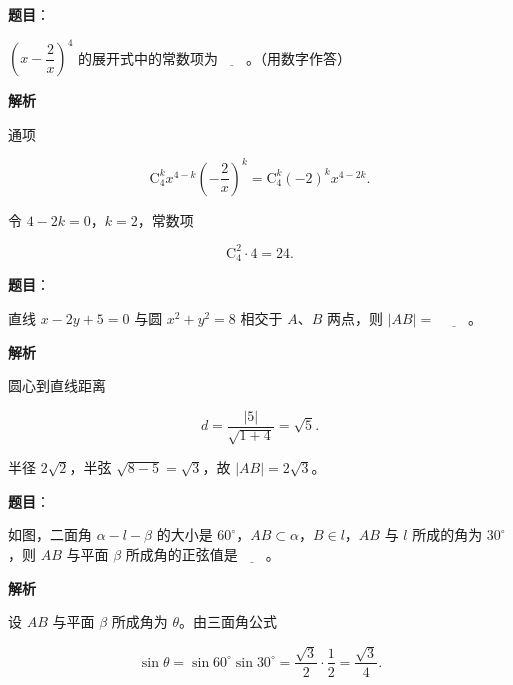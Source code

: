 \begin{answer}

\textbf{题目}：

$\left(x-\dfrac2x\right)^4$ 的展开式中的常数项为$\underline{\qquad}$。（用数字作答）

\textbf{解析}

通项

\nopagebreak[4]
\[\mathrm C_4^k x^{4-k}\left(-\frac2x\right)^k=\mathrm C_4^k(-2)^kx^{4-2k}.\]

令 $4-2k=0$，$k=2$，常数项

\nopagebreak[4]
\[\mathrm C_4^2\cdot4=24.\]


\end{answer}
\begin{answer}

\textbf{题目}：

直线 $x-2y+5=0$ 与圆 $x^2+y^2=8$ 相交于 $A$、$B$ 两点，则 $|AB|=$ $\underline{\qquad}$。

\textbf{解析}

圆心到直线距离

\nopagebreak[4]
\[d=\frac{|5|}{\sqrt{1+4}}=\sqrt5.\]

半径 $2\sqrt2$，半弦 $\sqrt{8-5}=\sqrt3$，故 $|AB|=2\sqrt3$。


\end{answer}
\begin{answer}

\textbf{题目}：

如图，二面角 $\alpha-l-\beta$ 的大小是 $60^\circ$，$AB\subset\alpha$，$B\in l$，$AB$ 与 $l$ 所成的角为 $30^\circ$，则 $AB$ 与平面 $\beta$ 所成角的正弦值是$\underline{\qquad}$。
\nopagebreak[4]
\begin{center}\end{center}
\nopagebreak[4]
\textbf{解析}

设 $AB$ 与平面 $\beta$ 所成角为 $\theta$。由三面角公式

\nopagebreak[4]
\[\sin\theta=\sin60^\circ\sin30^\circ
=\frac{\sqrt3}2\cdot\frac12=\frac{\sqrt3}4.\]


\end{answer}
